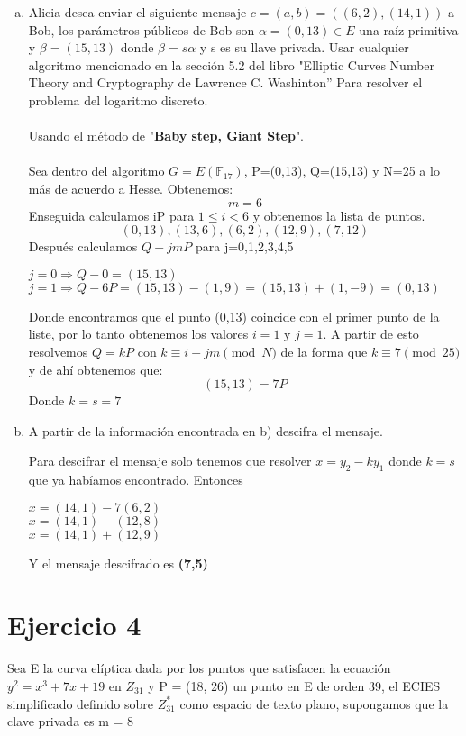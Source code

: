 \documentclass[12pt, letterpaper]{article}
\begin{document}
\begin{enumerate}[a)]
\begin{table}[htbp]
\begin{center}
\end{center}
\end{table}
\item Alicia desea enviar el siguiente mensaje $c = (a,b) = ((6,2),(14,1))$ a Bob, los
parámetros públicos de Bob son $\alpha = (0, 13) \in E$ una raíz primitiva y $\beta = (15, 13)$
donde $\beta = s\alpha$ y s es su llave privada. Usar cualquier algoritmo mencionado en la
sección 5.2 del libro "Elliptic Curves Number Theory and Cryptography de Lawrence
C. Washinton” Para resolver el problema del logaritmo discreto.
\\
\\
Usando el método de "\textbf{Baby step, Giant Step}".
\\
\\
Sea dentro del algoritmo $G= E(\mathbb{F}_{17})$, P=(0,13), Q=(15,13) y N=25 a lo más de acuerdo a Hesse. Obtenemos: 
\[
m=6
\]
Enseguida calculamos iP para $1\leq i<6$ y obtenemos la lista de puntos.
\\
\[
(0,13), (13,6), (6,2), (12,9), (7,12)
\]
Después calculamos $Q-jmP$ para j={0,1,2,3,4,5}
\\
\begin{center}
$j=0 \Rightarrow Q-0 =(15,13)$
\\
$j=1 \Rightarrow Q-6P =(15,13)-(1,9)=(15,13)+(1,-9)=(0,13)$
\\
\end{center}
Donde encontramos que el punto (0,13) coincide con el primer punto de la liste, por lo tanto obtenemos los valores $i=1$ y $j=1$.
A partir de esto resolvemos $Q=kP$ con $k \equiv i+jm \pmod{N}$ de la forma que $k \equiv 7 \pmod{25}$ y de ahí obtenemos que:
\[
(15,13)= 7P
\]
Donde $k=s=7$
\\
\item A partir de la información encontrada en b) descifra el mensaje.

Para descifrar el mensaje solo tenemos que resolver $x=y_2-ky_1$ donde $k=s$ que ya habíamos encontrado.
Entonces 
\begin{center}
$x=(14,1)-7(6,2)$
\\
$x=(14,1)-(12,8)$
\\
$x=(14,1)+(12,9)$
\end{center}
Y el mensaje descifrado es \textbf{(7,5)}
\end{enumerate}

\section*{Ejercicio 4}
Sea E la curva elíptica dada por los puntos que satisfacen la ecuación $y^2 = x^3 + 7x + 19$ en $Z_{31}$ y P = (18, 26) un punto en E de orden 39, el ECIES simplificado definido sobre $Z^*_{31}$ como espacio de texto plano, supongamos que la clave privada es m = 8
\end{document}
